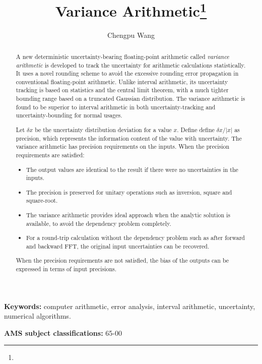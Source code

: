 \documentclass[twoside]{article}
\title{Variance Arithmetic\footnote{\whenaccepted}}
\author{Chengpu Wang
\institution{40 Grossman Street, Melville, NY 11747, USA}
\email{Chengpu@gmail.com}}
\date{}
\numberwithin{equation}{section}
\newcommand{\keywords}[1]{\small\textbf{Keywords: }#1}
\newcommand{\AMSsubj}[1]{\noindent\textbf{AMS subject classifications: }#1}
\begin{document}
\maketitle
\begin{abstract}
A new deterministic uncertainty-bearing floating-point arithmetic called \emph{variance arithmetic} is developed to track the uncertainty for arithmetic calculations statistically.  
It uses a novel rounding scheme to avoid the excessive rounding error propagation in conventional floating-point arithmetic. 
Unlike interval arithmetic, its uncertainty tracking is based on statistics and the central limit theorem, with a much tighter bounding range based on a truncated Gaussian distribution. 
The variance arithmetic is found to be superior to interval arithmetic in both uncertainty-tracking and uncertainty-bounding for normal usages.

Let $\delta x$ be the uncertainty distribution deviation for a value $x$.
Define define $\delta x /|x|$ as precision, which represents the information content of the value with uncertainty.
The variance arithmetic has precision requirements on the inputs.
When the precision requirements are satisfied:
\begin{itemize}
\item The output values are identical to the result if there were no uncertainties in the inputs.

\item The precision is preserved for unitary operations such as inversion, square and square-root.

\item The variance arithmetic provides ideal approach when the analytic solution is available, to avoid the dependency problem completely.

\item For a round-trip calculation without the dependency problem such as after forward and backward FFT, the original input uncertainties can be recovered.
\end{itemize}
When the precision requirements are not satisfied, the bias of the outputs can be expressed in terms of input precisions.

\end{abstract}
\keywords{computer arithmetic, error analysis, interval arithmetic, uncertainty, numerical algorithms.}

\AMSsubj{65-00}
\end{document}
